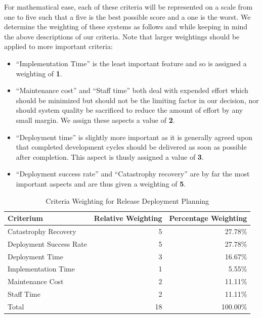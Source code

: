 \documentclass[12pt]{article}
\begin{document}
For mathematical ease, each of these criteria will be represented on a scale from one to five such that a five is the best possible score and a one is the worst. We determine the weighting of these systems as follows and while keeping in mind the above descriptions of our criteria. Note that larger weightings should be applied to more important criteria:
\begin{itemize}
\item ``Implementation Time'' is the least important feature and so is assigned a weighting of {\bf 1}.
\item ``Maintenance cost'' and ``Staff time'' both deal with expended effort which should be minimized but should not be the limiting factor in our decision, nor should system quality be sacrificed to reduce the amount of effort by any small margin. We assign these aspects a value of {\bf 2}.
\item ``Deployment time'' is slightly more important as it is generally agreed upon that completed development cycles should be delivered as soon as possible after completion. This aspect is thusly assigned a value of {\bf 3}.
\item ``Deployment success rate'' and ``Catastrophy recovery'' are by far the most important aspects and are thus given a weighting of {\bf 5}.
\end{itemize}

\begin{table}[ht]
\caption{Criteria Weighting for Release Deployment Planning}
\label{tbl:weighting-rdp}
\centering
\begin{tabular}{|l|r|r|}
    \hline
    Criterium & Relative Weighting & Percentage Weighting \\
    \hline
    \hline
    Catastrophy Recovery    &  5 &  27.78\% \\
    Deployment Success Rate &  5 &  27.78\% \\
    Deployment Time         &  3 &  16.67\% \\
    Implementation Time     &  1 &   5.55\% \\
    Maintenance Cost        &  2 &  11.11\% \\
    Staff Time              &  2 &  11.11\% \\
    \hline
    \hline
    Total                   & 18 & 100.00\% \\
    \hline
\end{tabular}
\end{table}
\end{document}
